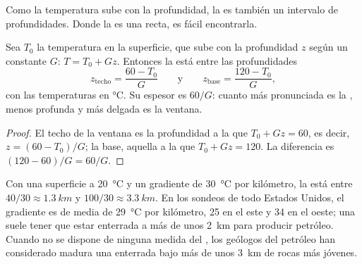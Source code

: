 Como la temperatura sube con la profundidad, la  es
también un intervalo de profundidades. Donde la  es una recta, es
fácil encontrarla.

\begin{proposition}\label{prop:g11:fossil-fuel-geology:window-depth}
Sea $T_0$ la temperatura en la superficie, que sube con la profundidad $z$
según un  constante $G$: $T = T_0 + G z$. Entonces la
 está entre las profundidades
\[
  z_{\text{techo}} = \frac{60 - T_0}{G}
  \qquad\text{y}\qquad
  z_{\text{base}} = \frac{120 - T_0}{G},
\]
con las temperaturas en \unit{\degreeCelsius}. Su espesor es $60/G$: cuanto
más pronunciada es la , menos profunda y más delgada es la ventana.
\end{proposition}

\begin{proof}
El techo de la ventana es la profundidad a la que $T_0 + G z = 60$, es decir,
$z = (60 - T_0)/G$; la base, aquella a la que $T_0 + G z = 120$. La diferencia
es $(120 - 60)/G = 60/G$.
\end{proof}

Con una superficie a \qty{20}{\degreeCelsius} y un gradiente de
\qty{30}{\degreeCelsius} por kilómetro, la  está entre
$40/30 \approx \qty{1.3}{km}$ y $100/30 \approx \qty{3.3}{km}$. En los sondeos
de todo Estados Unidos, el gradiente es de media de
\qty{29}{\degreeCelsius} por kilómetro, \num{25} en el este y \num{34}
en el oeste; una  suele tener que estar enterrada a más de unos
\qty{2}{km} para producir petróleo. Cuando no se dispone de ninguna medida del
, los geólogos del petróleo han considerado madura una  enterrada bajo más de unos \qty{3}{km} de rocas más jóvenes.

